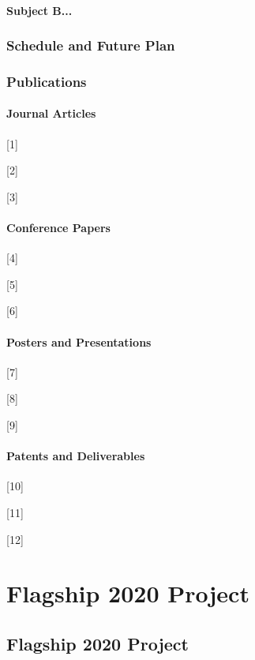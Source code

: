 \documentclass{book}
\begin{document}
\subsection{Subject B...}

\section{Schedule and Future Plan}

\section{Publications}

\subsection{Journal Articles}

[1] 

[2]

[3]

\subsection{Conference Papers}

[4]

[5]

[6]

\subsection{Posters and Presentations}

[7]

[8]

[9]

\subsection{Patents and Deliverables}

[10]

[11]

[12]


\part{Flagship 2020 Project}


\chapter{Flagship 2020 Project}
\end{document}
